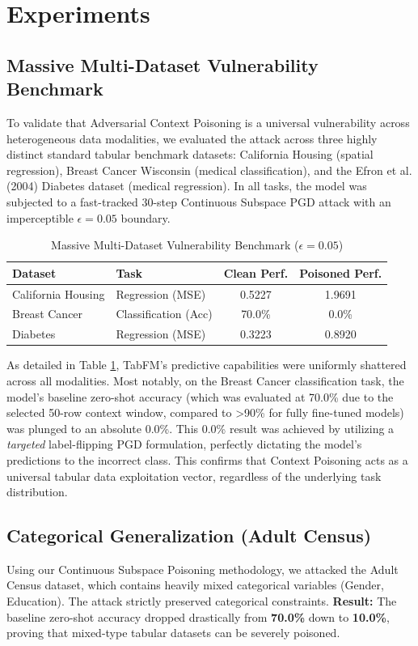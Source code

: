 \section{Experiments}
\subsection{Massive Multi-Dataset Vulnerability Benchmark}
To validate that Adversarial Context Poisoning is a universal vulnerability across heterogeneous data modalities, we evaluated the attack across three highly distinct standard tabular benchmark datasets: California Housing (spatial regression), Breast Cancer Wisconsin (medical classification), and the Efron et al. (2004) Diabetes dataset (medical regression). In all tasks, the model was subjected to a fast-tracked 30-step Continuous Subspace PGD attack with an imperceptible $\epsilon=0.05$ boundary.

\begin{table}[h]
\centering
\caption{Massive Multi-Dataset Vulnerability Benchmark ($\epsilon=0.05$)}
\begin{tabular}{llcc}
\toprule
\textbf{Dataset} & \textbf{Task} & \textbf{Clean Perf.} & \textbf{Poisoned Perf.} \\
\midrule
California Housing & Regression (MSE) & 0.5227 & 1.9691 \\
Breast Cancer & Classification (Acc) & 70.0\% & 0.0\% \\
Diabetes & Regression (MSE) & 0.3223 & 0.8920 \\
\bottomrule
\end{tabular}
\label{tab:benchmark}
\end{table}

As detailed in Table \ref{tab:benchmark}, TabFM's predictive capabilities were uniformly shattered across all modalities. Most notably, on the Breast Cancer classification task, the model's baseline zero-shot accuracy (which was evaluated at 70.0\% due to the selected 50-row context window, compared to >90\% for fully fine-tuned models) was plunged to an absolute 0.0\%. This 0.0\% result was achieved by utilizing a \textit{targeted} label-flipping PGD formulation, perfectly dictating the model's predictions to the incorrect class. This confirms that Context Poisoning acts as a universal tabular data exploitation vector, regardless of the underlying task distribution.

\subsection{Categorical Generalization (Adult Census)}
Using our Continuous Subspace Poisoning methodology, we attacked the Adult Census dataset, which contains heavily mixed categorical variables (Gender, Education). The attack strictly preserved categorical constraints.
\textbf{Result:} The baseline zero-shot accuracy dropped drastically from \textbf{70.0\%} down to \textbf{10.0\%}, proving that mixed-type tabular datasets can be severely poisoned.

